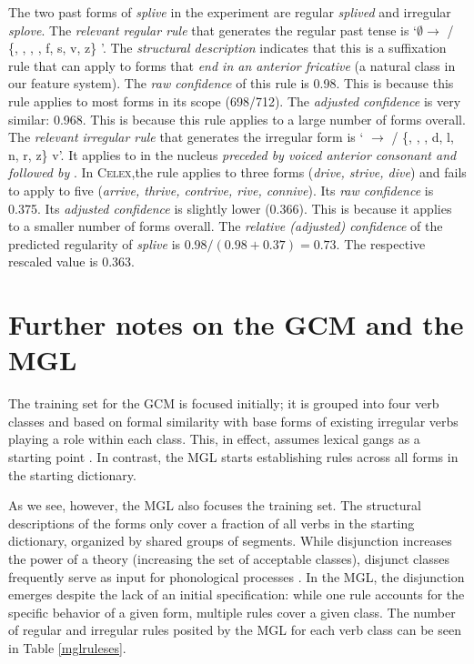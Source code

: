 \documentclass[12pt]{article}
\begin{document}
The two past forms of {\em splive} in the experiment are regular {\em splived} and irregular {\em splove}. The {\em relevant regular rule} that generates the regular past tense is `$\emptyset{} \rightarrow{}$ \textipa{[d]} / \{, , , , f, s, v, z\} \underline{\hspace{0.5cm}}'. The {\em structural description} indicates that this is a suffixation rule that can apply to forms that {\em end in an anterior fricative} (a natural class in our feature system).  The {\em raw confidence} of this rule is 0.98. This is because this rule applies to most forms in its scope (698/712). The {\em adjusted confidence} is very similar: 0.968. This is because this rule applies to a large number of forms overall. The {\em relevant irregular rule} that generates the irregular form is `\textipa{[aI]} $\rightarrow{}$ \textipa{[oU]} / \{, , , d, l, n, r, z\} \underline{\hspace{0.5cm}}v'. It applies to \textipa{[aI]} in the nucleus {\em preceded by voiced anterior consonant and followed by \textipa{[v]}}. In \textsc{Celex},the rule applies to three forms ({\em drive, strive, dive}) and fails to apply to five ({\em arrive, thrive, contrive, rive, connive}). Its {\em raw confidence} is 0.375. Its {\em adjusted confidence} is slightly lower (0.366). This is because it applies to a smaller number of forms overall. The {\em relative (adjusted) confidence} of the predicted regularity of {\em splive} is $0.98/(0.98+0.37)=0.73$. The respective rescaled value is 0.363.

\section{Further notes on the GCM and the MGL \label{appendixgcmvsmgl}}

The training set for the GCM is focused initially; it is grouped into four verb classes and based on formal similarity with base forms of existing irregular verbs playing a role within each class. This, in effect, assumes lexical gangs as a starting point \citep{alegre1999rule}. In contrast, the MGL starts establishing rules across all forms in the starting dictionary.

As we see, however, the MGL also focuses the training set. The structural descriptions of the forms only cover a fraction of all verbs in the starting dictionary, organized by shared groups of segments. While disjunction increases the power of a theory (increasing the set of acceptable classes), disjunct classes frequently serve as input for phonological processes \citep{mielke2008emergence} . In the MGL, the disjunction emerges despite the lack of an initial specification: while one rule accounts for the specific behavior of a given form, multiple rules cover a given class. The number of regular and irregular rules posited by the MGL for each verb class can be seen in Table \ref{mglruleses}. 
\end{document}
